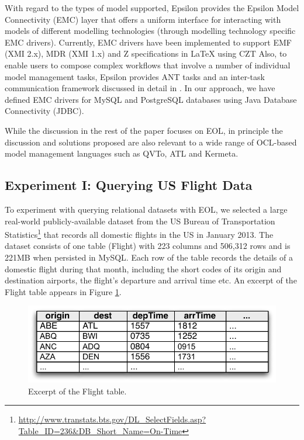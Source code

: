 With regard to the types of model supported, Epsilon provides the Epsilon Model Connectivity (EMC) layer that offers a uniform interface for interacting with models of different modelling technologies (through modelling technology specific EMC drivers).
Currently, EMC drivers have been implemented to support EMF \cite{EMF} (XMI 2.x), MDR \cite{MDR} (XMI 1.x) and Z \cite{UzingZ} specifications in LaTeX using CZT \cite{CZT} Also, to enable users to compose complex workflows that involve a number of individual model management tasks, Epsilon provides ANT \cite{ANT} tasks and an inter-task communication framework discussed in detail in \cite{EpsilonWorkflow}.
In our approach, we have defined EMC drivers for MySQL and PostgreSQL databases using Java Database Connectivity (JDBC).

While the discussion in the rest of the paper focuses on EOL, in principle the discussion and solutions proposed are also relevant to a wide range of OCL-based model management languages such as QVTo, ATL and Kermeta.

\subsection{Experiment I: Querying US Flight Data}
To experiment with querying relational datasets with EOL, we selected a large real-world publicly-available dataset from the US Bureau of Transportation Statistics\footnote{\url{http://www.transtats.bts.gov/DL_SelectFields.asp?Table_ID=236&DB_Short_Name=On-Time}} that records all domestic flights in the US in January 2013. 
The dataset consists of one table (Flight) with 223 columns and 506,312 rows and is 221MB when persisted in MySQL. Each row of the table records the details of a domestic flight during that month, including the short codes of its origin and destination airports, the flight's departure and arrival time etc. An excerpt of the Flight table appears in Figure \ref{fig:database}. 

\begin{figure}[ht]
	\centering
	\includegraphics[width=.9\textwidth]{images/database.pdf}
	\caption{Excerpt of the Flight table.}
	\label{fig:database}
\end{figure}

